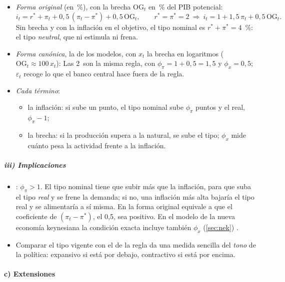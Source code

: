 \documentclass[11pt]{article}
\begin{document}
\begin{itemize}
\item \emph{Forma original} (en~\%), con la brecha $\mathrm{OG}_t$ en~\% del PIB potencial:
  $$i_t=r^*+\pi_t+0{,}5\,(\pi_t-\pi^*)+0{,}5\,\mathrm{OG}_t,\qquad r^*=\pi^*=2\ \Longrightarrow\ i_t=1+1{,}5\,\pi_t+0{,}5\,\mathrm{OG}_t .$$
  Sin brecha y con la inflación en el objetivo, el tipo nominal es $r^*+\pi^*=4$~\%: el tipo \emph{neutral}, que ni estimula ni frena.
\item \emph{Forma canónica}, la de los modelos, con $x_t$ la brecha en logaritmos ($\mathrm{OG}_t\approx100\,x_t$):
  Las 2~son la misma regla, con $\phi_\pi=1+0{,}5=1{,}5$ y $\phi_x=0{,}5$; $\varepsilon_t$ recoge lo que el banco central hace fuera de la regla.
\item \emph{Cada término}:
  \begin{itemize}
  \item la inflación: si sube un punto, el tipo nominal sube $\phi_\pi$ puntos y el real, $\phi_\pi-1$;
  \item la brecha: si la producción supera a la natural, se sube el tipo; $\phi_x$ mide cuánto pesa la actividad frente a la inflación.
  \end{itemize}
\end{itemize}

\subparagraph{iii) Implicaciones}

\begin{itemize}
\item {}: $\phi_\pi>1$. El tipo nominal tiene que subir más que la inflación, para que suba el tipo \emph{real} y se frene la demanda; si no, una inflación más alta bajaría el tipo real y se alimentaría a sí misma. En la forma original equivale a que el coeficiente de $(\pi_t-\pi^*)$, el 0,5, sea positivo. En el modelo de la nueva economía keynesiana la condición exacta incluye también $\phi_x$ (\ref{sec:nek}) .
\item Comparar el tipo vigente con el de la regla da una medida sencilla del \emph{tono} de la política: expansivo si está por debajo, contractivo si está por encima.
\end{itemize}

\paragraph{c) Extensiones}
\end{document}
